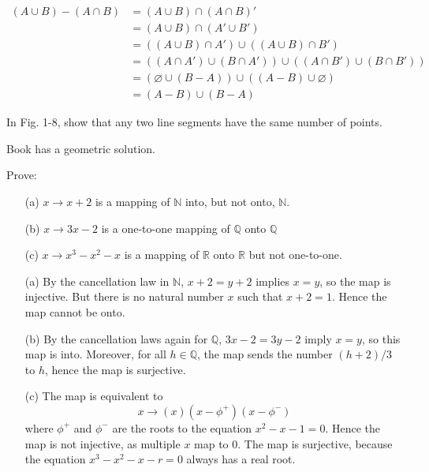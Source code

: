 \answer
\begin{align*}
    (A \cup B) - (A \cap B) &= (A \cup B) \cap (A \cap B)' \\
                            &= (A \cup B) \cap (A' \cup B') \\
                            &= ((A \cup B) \cap A') \cup ((A \cup B) \cap B') \\
                            &= ((A \cap A') \cup (B \cap A')) \cup ((A \cap B') \cup (B \cap B')) \\
                            &= (\varnothing \cup (B-A)) \cup ((A-B) \cup \varnothing) \\
                            &= (A-B) \cup (B-A)
\end{align*}


\exercise
In Fig. 1-8, show that any two line segments have the same number of points.

\answer
Book has a geometric solution. 


\exercise
Prove: 
\begin{itemize}
    \item[(a)]
        $x \to x+2$ is a mapping of $\mathbb{N}$ into, but not onto, $\mathbb{N}$.
    \item[(b)]
        $x \to 3x - 2$ is a one-to-one mapping of $\mathbb{Q}$ onto $\mathbb{Q}$
    \item[(c)]
        $x \to x^3 - x^2 - x$ is a mapping of $\mathbb{R}$ onto $\mathbb{R}$ but not one-to-one.
\end{itemize}

\answer
\begin{itemize}
    \item[(a)]
        By the cancellation law in $\mathbb{N}$, $x + 2 = y + 2$ implies $x = y$, so the map is injective. But there is no natural number $x$ such that $x+2 = 1$. Hence the map cannot be onto.
    \item[(b)]
        By the cancellation laws again for $\mathbb{Q}$, $3x - 2 = 3y - 2$ imply $x = y$, so this map is into. Moreover, for all $h \in \mathbb{Q}$, the map sends the number $(h+2)/3$ to $h$, hence the map is surjective.
    \item[(c)]
        The map is equivalent to 
        \[x \to (x)(x - \phi^+)(x - \phi^-)\]
        where $\phi^+$ and $\phi^-$ are the roots to the equation $x^2 - x - 1 = 0$. Hence the map is not injective, as multiple $x$ map to $0$.
        The map is surjective, because the equation $x^3 - x^2 - x - r = 0$ always has a real root.
\end{itemize}



